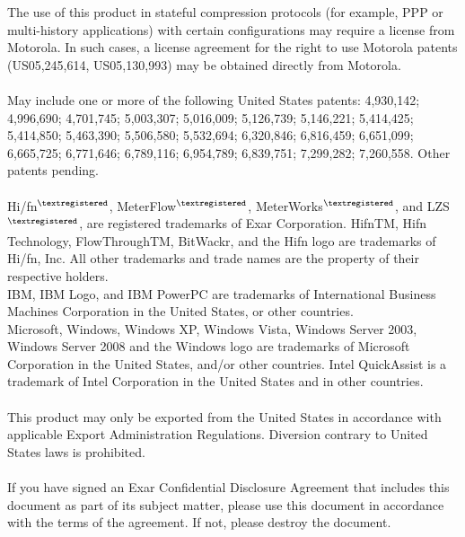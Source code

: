 {  {\scriptsize\noindent{}The use of this product in stateful compression protocols (for
  example, PPP or multi-history applications) with certain
  configurations may require a license from Motorola. In such cases, a
  license agreement for the right to use Motorola patents (US05,245,614,
  US05,130,993) may be obtained directly from Motorola.}\\[.5ex]

  \noindent{\small\textbf{\textcolor{ThemeColor}{Patents}}}\\[.5ex]

  {\scriptsize\noindent{}May include one or more of the following United States patents:
  4,930,142; 4,996,690; 4,701,745; 5,003,307; 5,016,009; 5,126,739;
  5,146,221; 5,414,425; 5,414,850; 5,463,390; 5,506,580; 5,532,694;
  6,320,846; 6,816,459; 6,651,099; 6,665,725; 6,771,646; 6,789,116;
  6,954,789; 6,839,751; 7,299,282; 7,260,558. Other patents pending.}\\[.5ex]

  \noindent{\small\textbf{\textcolor{ThemeColor}{Trademarks}}}\\[.5ex]

  {\scriptsize\noindent{}Hi/fn{\tiny$^{\textregistered}$}, MeterFlow{\tiny$^{\textregistered}$},
  MeterWorks{\tiny$^{\textregistered}$}, and LZS{\tiny$^{\textregistered}$}, are registered
  trademarks of Exar Corporation. HifnTM, Hifn Technology,
  FlowThroughTM, BitWackr, and the Hifn logo are trademarks of Hi/fn,
  Inc. All other trademarks and trade names are the property of their
  respective holders.}\\[.5ex]

  {\scriptsize\noindent{}IBM, IBM Logo, and IBM PowerPC are trademarks of
  International Business Machines Corporation in the United States, or
  other countries.}\\[.5ex]

  {\scriptsize\noindent{}Microsoft, Windows, Windows XP, Windows Vista,
  Windows Server 2003, Windows Server 2008 and the Windows logo are
  trademarks of Microsoft Corporation in the United States, and/or other
  countries.  Intel QuickAssist is a trademark of Intel Corporation in
  the United States and in other countries.}\\[.5ex]

  \noindent{\small\textbf{\textcolor{ThemeColor}{Exporting}}}\\[.5ex]

  {\scriptsize\noindent{}This product may only be exported from the United States in accordance
  with applicable Export Administration Regulations. Diversion contrary
  to United States laws is prohibited.}\\[.5ex]

  \noindent{\small\textbf{\textcolor{ThemeColor}{Exar Confidential}}}\\[.5ex]

  {\scriptsize\noindent{}If you have signed an Exar Confidential Disclosure Agreement that
  includes this document as part of its subject matter, please use this
  document in accordance with the terms of the agreement. If not, please
  destroy the document.}\\[.5ex]

}
\pagebreak
